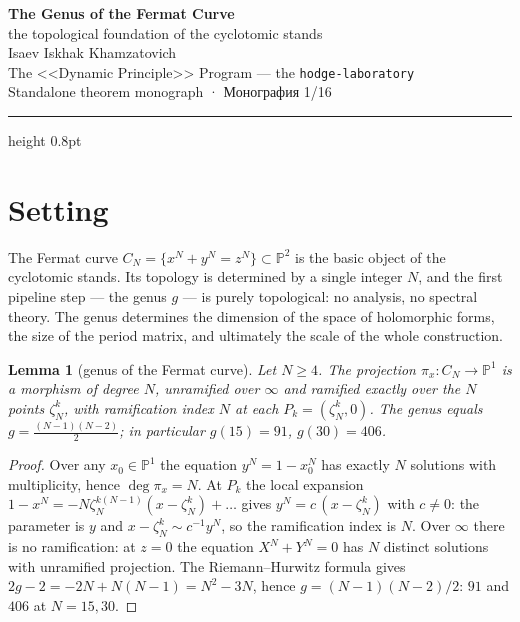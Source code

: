 \documentclass[11pt,a4paper]{article}
\theoremstyle{plain}
\newtheorem{lemma}[theorem]{Lemma}
\theoremstyle{definition}
\theoremstyle{remark}
\begin{document}
\begin{center}
{\LARGE\bfseries The Genus of the Fermat Curve}\\[0.4em]
{\large the topological foundation of the cyclotomic stands}\\[0.6em]
{\normalsize Isaev Iskhak Khamzatovich}\\[0.2em]
{\normalsize The <<Dynamic Principle>> Program --- the \texttt{hodge-laboratory}}\\[0.15em]
{\small Standalone theorem monograph · Монография 1/16}
\end{center}
\vspace{0.4em}
{\color{linkblue}\hrule height 0.8pt}
\vspace{0.8em}

\section{Setting}

The Fermat curve $C_N=\{x^N+y^N=z^N\}\subset\mathbb{P}^2$ is the
basic object of the cyclotomic stands. Its topology is determined by
a single integer $N$, and the first pipeline step --- the genus $g$
--- is purely topological: no analysis, no spectral theory. The
genus determines the dimension of the space of holomorphic forms,
the size of the period matrix, and ultimately the scale of the whole
construction.

\begin{lemma}[genus of the Fermat curve]\label{lem:genus}
Let $N\ge 4$. The projection $\pi_x\colon C_N\to\mathbb{P}^1$ is a
morphism of degree $N$, unramified over $\infty$ and ramified
exactly over the $N$ points $\zeta_N^k$, with ramification index $N$
at each $P_k=(\zeta_N^k,0)$. The genus equals
$g=\frac{(N-1)(N-2)}{2}$; in particular $g(15)=91$, $g(30)=406$.
\end{lemma}

\begin{proof}
Over any $x_0\in\mathbb{P}^1$ the equation $y^N=1-x_0^N$ has exactly
$N$ solutions with multiplicity, hence $\deg\pi_x=N$. At $P_k$ the
local expansion $1-x^N=-N\zeta_N^{k(N-1)}(x-\zeta_N^k)+\dots$ gives
$y^N=c\,(x-\zeta_N^k)$ with $c\ne0$: the parameter is $y$ and
$x-\zeta_N^k\sim c^{-1}y^N$, so the ramification index is $N$. Over
$\infty$ there is no ramification: at $z=0$ the equation
$X^N+Y^N=0$ has $N$ distinct solutions with unramified projection.
The Riemann--Hurwitz formula gives
$2g-2=-2N+N(N-1)=N^2-3N$, hence
$g=(N-1)(N-2)/2$: $91$ and $406$ at $N=15,30$.
\end{proof}
\end{document}

